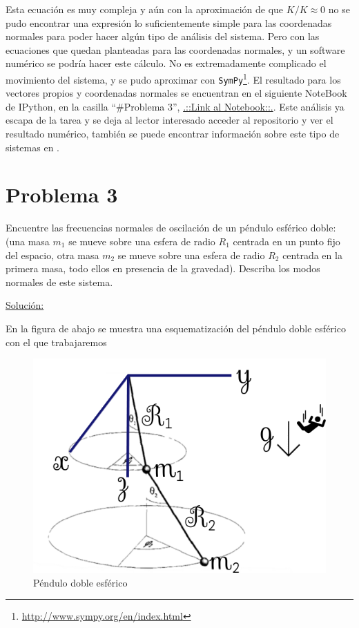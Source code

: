 \documentclass[a4paper,10pt]{article}
\numberwithin{equation}{section}
\begin{document}
Esta ecuación es muy compleja y aún con la aproximación de que $K/K \approx 0$ no 
se pudo encontrar una expresión lo suficientemente simple para las coordenadas normales 
para poder hacer algún tipo de análisis del sistema. Pero con las ecuaciones que quedan 
planteadas para las coordenadas normales, y un software numérico se podría hacer este 
cálculo. No es extremadamente complicado el movimiento del sistema, y se pudo aproximar 
con \texttt{SymPy}\footnote{\href{http://www.sympy.org/en/index.html}{http://www.sympy.org/en/index.html}}. 
El resultado para los vectores propios y coordenadas normales se encuentran en el siguiente 
NoteBook de IPython, en la casilla ``\#Problema 3'', \href{https://github.com/FavioVazquez/MecanicaClasica-PCF/blob/master/Tarea9/Matrices.ipynb}{\color{blue}.::Link al Notebook::.}. 
Este análisis ya escapa de la tarea y se deja al lector interesado acceder al repositorio 
y ver el resultado numérico, también se puede encontrar información sobre este tipo 
de sistemas en \cite{kotkin}.


\section{Problema 3}

Encuentre las frecuencias normales de oscilación de un péndulo esférico doble: (una 
masa $m_1$ se mueve sobre una esfera de radio $R_1$ centrada en un punto fijo del 
espacio, otra masa $m_2$ se mueve sobre una esfera de radio $R_2$ centrada en la 
primera masa, todo ellos en presencia de la gravedad). Describa los modos normales 
de este sistema.

\vspace{.3cm}

\underline{Solución:} \vspace{.3cm}

En la figura de abajo se muestra una esquematización del péndulo doble esférico
con el que trabajaremos

\begin{figure}[H]
 \center 
 \includegraphics[scale=0.43]{problema3fig1}
 \caption{Péndulo doble esférico}
 \label{fig:problema3fig1}
\end{figure}
\end{document}
